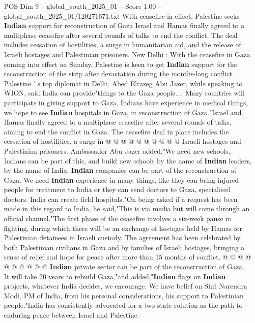 \begin{textsample}{POS Dim 9 – global\_south\_2025\_01 – Score 1.00 – global\_south\_2025\_01/120271671.txt}  \label{ex:f9_pos_306}
With ceasefire in effect, Palestine seeks \textbf{Indian} support for reconstruction of Gaza Israel and Hamas finally agreed to a multiphase ceasefire after several rounds of talks to end the conflict.
The deal includes cessation of hostilities, a surge in humanitarian aid, and the release of Israeli hostages and Palestinian prisoners.
New Delhi : With the ceasefire in Gaza coming into effect on Sunday, Palestine is keen to get \textbf{Indian} support for the reconstruction of the strip after devastation during the months-long conflict.
Palestine ' s top diplomat in Delhi, Abed Elrazeg Abu Jazer, while speaking to WION, said India can provide"things to the Gaza people....
Many countries will participate in giving support to Gaza.
Indians have experience in medical things, we hope to see \textbf{Indian} hospitals in Gaza, in reconstruction of Gaza."Israel and Hamas finally agreed to a multiphase ceasefire after several rounds of talks, aiming to end the conflict in Gaza.
The ceasefire deal in place includes the cessation of hostilities, a surge in @ @ @ @ @ @ @ @ @ @ Israeli hostages and Palestinian prisoners.
Ambassador Abu Jazer added,"We need new schools, Indians can be part of this, and build new schools by the name of \textbf{Indian} leaders, by the name of India. \textbf{Indian} companies can be part of the reconstruction of Gaza.
We need \textbf{Indian} experience in many things, like they can bring injured people for treatment to India or they can send doctors to Gaza, specialised doctors.
India can create field hospitals."On being asked if a request has been made in this regard to India, he said,"This is via media but will come through an official channel."The first phase of the ceasefire involves a six-week pause in fighting, during which there will be an exchange of hostages held by Hamas for Palestinian detainees in Israeli custody.
The agreement has been celebrated by both Palestinian civilians in Gaza and by families of Israeli hostages, bringing a sense of relief and hope for peace after more than 15 months of conflict. @ @ @ @ @ @ @ @ @ @ \textbf{Indian} private sector can be part of the reconstruction of Gaza.
It will take 20 years to rebuild Gaza,"and added,"\textbf{Indian} flags on \textbf{Indian} projects, whatever India decides, we encourage.
We have belief on Shri Narendra Modi, PM of India, from his personal considerations, his support to Palestinian people."India has consistently advocated for a two-state solution as the path to enduring peace between Israel and Palestine.

\end{textsample}

